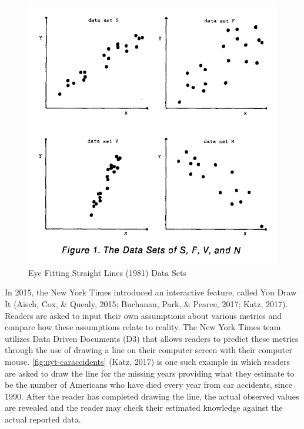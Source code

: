 \documentclass[print]{nuthesis}
\begin{document}
\begin{figure}[tbp]

{\centering \includegraphics[width=0.7\linewidth,]{images/eyefitting-straight-lines-plots} 

}

\caption{Eye Fitting Straight Lines (1981) Data Sets}\label{fig:mosteller-eyefitting-plot}
\end{figure}

In 2015, the New York Times introduced an interactive feature, called You Draw It (Aisch, Cox, \& Quealy, 2015; Buchanan, Park, \& Pearce, 2017; Katz, 2017).
Readers are asked to input their own assumptions about various metrics and compare how these assumptions relate to reality.
The New York Times team utilizes Data Driven Documents (D3) that allows readers to predict these metrics through the use of drawing a line on their computer screen with their computer mouse.
\cref{fig:nyt-caraccidents} (Katz, 2017) is one such example in which readers are asked to draw the line for the missing years providing what they estimate to be the number of Americans who have died every year from car accidents, since 1990.
After the reader has completed drawing the line, the actual observed values are revealed and the reader may check their estimated knowledge against the actual reported data.
\end{document}
